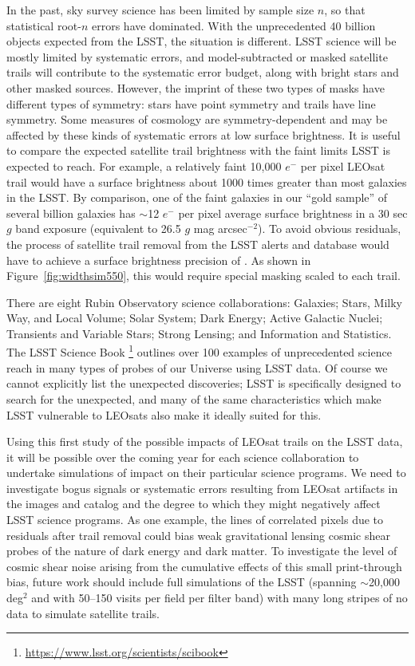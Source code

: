\documentclass[twocolumn,trackchanges]{aastex63}
\begin{document}
In the past, sky survey science has been limited by sample size $n$, so that statistical root-$n$ errors have dominated. With the unprecedented 40 billion objects expected from the LSST, the situation is different. LSST science will be mostly limited by systematic errors, and model-subtracted or masked satellite trails will contribute to the systematic error budget, along with bright stars and other masked sources.
However, the imprint of these two types of masks have different types of symmetry: stars have point symmetry and trails have line symmetry. Some measures of cosmology are symmetry-dependent and may be affected by these kinds of systematic errors at low surface brightness.  It is useful to compare the expected satellite trail brightness with the faint limits LSST is expected to reach.
For example, a relatively faint 10,000 $e^-$ per pixel LEOsat trail would have a surface brightness about 1000 times greater than most galaxies in the LSST. By comparison, one of the faint galaxies in our ``gold sample'' of several billion galaxies has $\sim$12 $e^-$ per pixel average surface brightness in a 30 sec $g$ band exposure (equivalent to 26.5 $g$ mag arcsec$^{-2}$). To avoid obvious residuals, the process of satellite trail removal from the LSST alerts and database would have to achieve a surface brightness precision of . As shown in Figure~\ref{fig:widthsim550}, this would require special masking scaled to each trail.


There are eight Rubin Observatory science collaborations: Galaxies; Stars, Milky Way, and Local Volume; Solar System; Dark Energy; Active Galactic Nuclei; Transients and Variable Stars; Strong Lensing; and Information and Statistics.
The LSST Science Book \citep{scibook}\footnote{\url{https://www.lsst.org/scientists/scibook}} outlines over 100 examples of unprecedented science reach in many types of probes of our Universe using LSST data. Of course we cannot explicitly list the unexpected discoveries; LSST is specifically designed to search for the unexpected, and many of the same characteristics which make LSST vulnerable to LEOsats also make it ideally suited for this.

Using this first study of the possible impacts of LEOsat trails on the LSST data, it will be possible over the coming year for each science collaboration to undertake simulations of impact on their particular science programs.
We need to investigate bogus signals or systematic errors resulting from LEOsat artifacts in the images and catalog and the degree to which they might negatively affect LSST science programs. As one example, the lines of correlated pixels due to residuals after trail removal could bias weak gravitational lensing cosmic shear probes of the nature of dark energy and dark matter. To investigate the level of cosmic shear noise arising from the cumulative effects of this small print-through bias, future work should include full simulations of the LSST (spanning $\sim$20,000 deg$^2$ and with 50--150 visits per field per filter band) with many long stripes of no data to simulate satellite trails.
\end{document}
